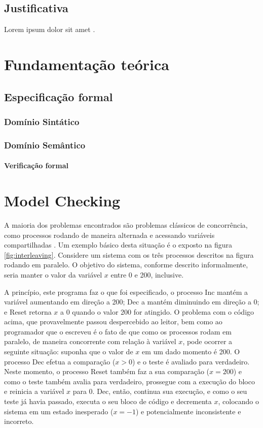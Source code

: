 \documentclass{utfpr-pg}
\begin{document}
\section{Justificativa}
\lipsum[4-7] Lorem ipsum dolor sit amet \cite{gummalla}.

\chapter{Fundamentação teórica}
\lipsum[2-4]

\section{Especificação formal}
\lipsum[7-9]
\subsection{Domínio Sintático}
\lipsum[10-11]
\subsection{Domínio Semântico}
\lipsum[12-15]
\subsubsection{Verificação formal}
\lipsum[16-17]
\lipsum[20-27]

\chapter{Model Checking}

A maioria dos problemas encontrados são problemas clássicos de concorrência, como processos rodando de maneira alternada e acessando variáveis compartilhadas \cite{Katoen08}. Um exemplo básico desta situação é o exposto na figura \ref{fig:interleaving}. Considere um sistema com os três processos descritos na figura rodando em paralelo. O objetivo do sistema, conforme descrito informalmente, seria manter o valor da variável $\mathit{x}$ entre 0 e 200, inclusive.


A princípio, este programa faz o que foi especificado, o processo \textsf{Inc} mantém a variável aumentando em direção a 200; \textsf{Dec} a mantém diminuindo em direção a 0; e \textsf{Reset} retorna $\mathit{x}$ a 0 quando o valor 200 for atingido. O problema com o código acima, que provavelmente passou despercebido ao leitor, bem como ao programador que o escreveu é o fato de que como os processos rodam em paralelo, de maneira concorrente com relação à variável $\mathit{x}$, pode ocorrer a seguinte situação: suponha que o valor de $\mathit{x}$ em um dado momento é 200. O processo \textsf{Dec} efetua a comparação ($\mathit{x} > 0$) e o teste é avaliado para verdadeiro. Neste momento, o processo \textsf{Reset} também faz a sua comparação ($\mathit{x} = 200$) e como o teste também avalia para verdadeiro, prossegue com a execução do bloco e reinicia a variável $\mathit{x}$ para 0. \textsf{Dec}, então, continua sua execução, e como o seu teste já havia passado, executa o seu bloco de código e decrementa $\mathit{x}$, colocando o sistema em um estado inesperado ($\mathit{x} = -1$) e potencialmente inconsistente e incorreto.
\end{document}
